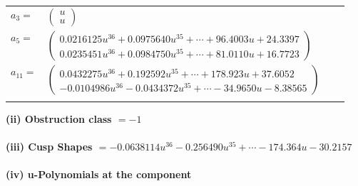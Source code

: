 \documentclass[1p]{elsarticle_modified}
\theoremstyle{definition}
\begin{document}
\begin{tabular}{m{7pt} m{180pt} m{7pt} m{180pt} }
\flushright $a_{3}=$&$\begin{pmatrix}u\\u\end{pmatrix}$ \\
\flushright $a_{5}=$&$\begin{pmatrix}0.0216125 u^{36}+0.0975640 u^{35}+\cdots+96.4003 u+24.3397\\0.0235451 u^{36}+0.0984750 u^{35}+\cdots+81.0110 u+16.7723\end{pmatrix}$ \\
\flushright $a_{11}=$&$\begin{pmatrix}0.0432275 u^{36}+0.192592 u^{35}+\cdots+178.923 u+37.6052\\-0.0104986 u^{36}-0.0434372 u^{35}+\cdots-34.9650 u-8.38565\end{pmatrix}$\\&\end{tabular}
\flushleft \textbf{(ii) Obstruction class $= -1$}\\~\\
\flushleft \textbf{(iii) Cusp Shapes $= -0.0638114 u^{36}-0.256490 u^{35}+\cdots-174.364 u-30.2157$}\\~\\
\newpage\renewcommand{\arraystretch}{1}
\flushleft \textbf{(iv) u-Polynomials at the component}\newline \\
\end{document}
